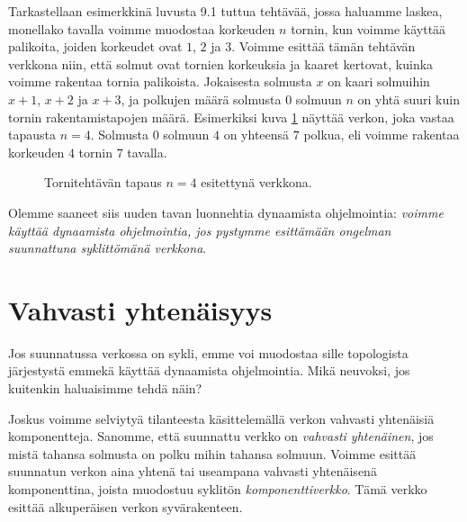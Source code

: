 Tarkastellaan esimerkkinä luvusta 9.1 tuttua tehtävää,
jossa haluamme laskea, monellako tavalla voimme muodostaa
korkeuden $n$ tornin, kun voimme käyttää palikoita,
joiden korkeudet ovat $1$, $2$ ja $3$.
Voimme esittää tämän tehtävän verkkona niin,
että solmut ovat tornien korkeuksia ja kaaret kertovat,
kuinka voimme rakentaa tornia palikoista.
Jokaisesta solmusta $x$ on kaari solmuihin
$x+1$, $x+2$ ja $x+3$,
ja polkujen määrä solmusta $0$ solmuun $n$
on yhtä suuri kuin tornin rakentamistapojen määrä.
Esimerkiksi kuva \ref{fig:verkol} näyttää verkon,
joka vastaa tapausta $n=4$.
Solmusta $0$ solmuun $4$ on yhteensä $7$ polkua,
eli voimme rakentaa korkeuden $4$ tornin $7$ tavalla.

\begin{figure}
\center
\begin{center}
\end{center}
\caption{Tornitehtävän tapaus $n=4$ esitettynä verkkona.}
\label{fig:verkol}
\end{figure}

Olemme saaneet siis uuden tavan luonnehtia dynaamista ohjelmointia:
\emph{voimme käyttää dynaamista ohjelmointia,
jos pystymme esittämään ongelman suunnattuna syklittömänä verkkona}.

\section{Vahvasti yhtenäisyys}


Jos suunnatussa verkossa on sykli,
emme voi muodostaa sille topologista järjestystä
emmekä käyttää dynaamista ohjelmointia.
Mikä neuvoksi, jos kuitenkin haluaisimme tehdä näin?

Joskus voimme selviytyä tilanteesta käsittelemällä
verkon vahvasti yhtenäisiä komponentteja.
Sanomme, että suunnattu verkko on \emph{vahvasti yhtenäinen},
jos mistä tahansa solmusta on polku mihin tahansa solmuun.
Voimme esittää suunnatun verkon aina yhtenä tai
useampana vahvasti yhtenäisenä komponenttina,
joista muodostuu syklitön \emph{komponenttiverkko}.
Tämä verkko esittää alkuperäisen verkon syvärakenteen.

